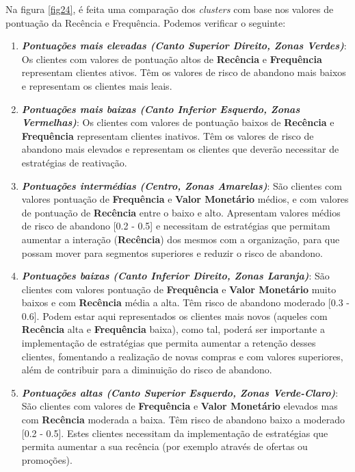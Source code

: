 \documentclass{easychair}
\begin{document}
Na figura \ref{fig24}, é feita uma comparação dos \textit{clusters} com base nos valores de pontuação da Recência e Frequência. Podemos verificar o seguinte:

\begin{enumerate}
	\item \textit{\textbf{Pontuações mais elevadas (Canto Superior Direito, Zonas Verdes)}}: Os clientes com valores de pontuação altos de \textbf{Recência} e \textbf{Frequência} representam clientes ativos. Têm os valores de risco de abandono mais baixos e representam os clientes mais leais.
	\item \textit{\textbf{Pontuações mais baixas (Canto Inferior Esquerdo, Zonas Vermelhas)}}: Os clientes com valores de pontuação baixos de \textbf{Recência} e \textbf{Frequência} representam clientes inativos. Têm os valores de risco de abandono mais elevados e representam os clientes que deverão necessitar de estratégias de reativação.
	\item \textit{\textbf{Pontuações intermédias (Centro, Zonas Amarelas)}}: São clientes com valores pontuação de \textbf{Frequência} e \textbf{Valor Monetário} médios, e com valores de pontuação de \textbf{Recência} entre o baixo e alto. Apresentam valores médios de risco de abandono [0.2 - 0.5] e necessitam de estratégias que permitam aumentar a interação (\textbf{Recência}) dos mesmos com a organização, para que possam mover para segmentos superiores e reduzir o risco de abandono.
	\item \textit{\textbf{Pontuações baixas (Canto Inferior Direito, Zonas Laranja)}}: São clientes com valores pontuação de \textbf{Frequência} e \textbf{Valor Monetário} muito baixos e com \textbf{Recência} média a alta. Têm risco de abandono moderado [0.3 - 0.6]. Podem estar aqui representados os clientes mais novos (aqueles com \textbf{Recência} alta e \textbf{Frequência} baixa), como tal, poderá ser importante a implementação de estratégias que permita aumentar a retenção desses clientes, fomentando a realização de novas compras e com valores superiores, além de contribuir para a diminuição do risco de abandono.
	\item \textit{\textbf{Pontuações altas (Canto Superior Esquerdo, Zonas Verde-Claro)}}: São clientes com valores de \textbf{Frequência} e \textbf{Valor Monetário} elevados mas com \textbf{Recência} moderada a baixa. Têm risco de abandono baixo a moderado [0.2 - 0.5]. Estes clientes necessitam da implementação de estratégias que permita aumentar a sua recência (por exemplo através de ofertas ou promoções).
\end{enumerate}
\end{document}

